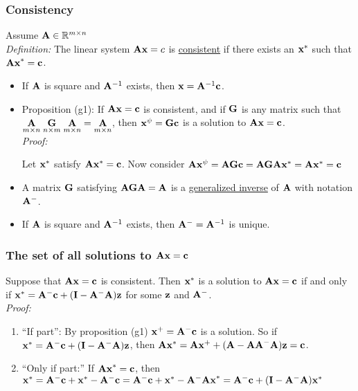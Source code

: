 \subsubsection*{Consistency}
Assume $\mathbf{A} \in \mathbb{R}^{m \times n}$\\
{\it Definition:} The linear system $\mathbf{Ax} = c$ is \underline{consistent} if there exists an $\mathbf{x}^*$ such that $\mathbf{Ax}^* = \mathbf{c}$.
\begin{itemize}
	\item If $\mathbf{A}$ is square and $\mathbf{A}^{-1}$ exists, then $\mathbf{x} = \mathbf{A}^{-1}\mathbf{c}$.
	\item Proposition (g1): If $\mathbf{Ax = c}$ is consistent, and if $\mathbf{G}$ is any matrix such that $\underset{m \times n}{\mathbf{A}} \;\underset{n \times m}{\mathbf{G}}\;\underset{m \times n}{\mathbf{A}} = \underset{m \times n}{\mathbf{A}}$, then $\mathbf{x}^\psi = \mathbf{Gc}$ is a solution to $\mathbf{Ax = c}$.\\
	{\it Proof:}
	\begin{pf}
		Let $\mathbf{x}^*$ satisfy $\mathbf{A}\mathbf{x}^* = \mathbf{c}$.
		Now consider $\mathbf{A}\mathbf{x}^\psi = \mathbf{AGc} = \mathbf{AGA}\mathbf{x}^* = \mathbf{A}\mathbf{x}^* = \mathbf{c}$
	\end{pf}
	\item A matrix $\mathbf{G}$ satisfying $\mathbf{AGA = A}$ is a \underline{generalized inverse} of $\mathbf{A}$ with notation $\mathbf{A}^-$.
	\item If $\mathbf{A}$ is square and $\mathbf{A}^{-1}$ exists, then $\mathbf{A}^- = \mathbf{A}^{-1}$ is unique.
\end{itemize}

\subsubsection*{The set of all solutions to $\mathbf{Ax=c}$}
Suppose that $\mathbf{Ax=c}$ is consistent. Then $\mathbf{x}^*$ is a solution to $\mathbf{Ax=c}$ if and only if
$\mathbf{x}^* = \mathbf{A}^- \mathbf{c}+ (\mathbf{I} - \mathbf{A}^- \mathbf{A})\mathbf{z}$ for some $\mathbf{z}$ and $\mathbf{A}^-$.\\
{\it Proof:}
\begin{pf}
	\begin{enumerate}
		\item ``If part'':	By proposition (g1) $\mathbf{x}^+ = \mathbf{A}^- \mathbf{c}$ is a solution.
		So if $\mathbf{x}^* = \mathbf{A}^-\mathbf{c} + (\mathbf{I} - \mathbf{A}^-\mathbf{A})\mathbf{z}$, then
		$\mathbf{A}\mathbf{x}^* = \mathbf{A}\mathbf{x}^+ + (\mathbf{A} - \mathbf{AA}^-\mathbf{A})\mathbf{z} = \mathbf{c}$.
		\item ``Only if part:'' If $\mathbf{Ax}^* = \mathbf{c}$, then $\mathbf{x}^* = \mathbf{A}^-\mathbf{c} + \mathbf{x}^* -\mathbf{A}^-\mathbf{c} = \mathbf{A}^-\mathbf{c} + \mathbf{x}^* -\mathbf{A}^-\mathbf{Ax}^* =  \mathbf{A}^-\mathbf{c} + (\mathbf{I} - \mathbf{A}^-\mathbf{A})\mathbf{x}^*$
	\end{enumerate}
\end{pf}


